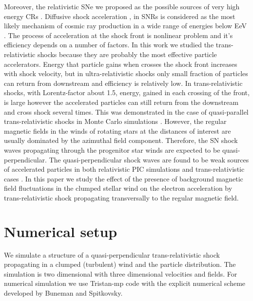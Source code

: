 \documentclass[a4paper]{jpconf}
\begin{document}
Moreover, the relativistic SNe we proposed as the possible sources of very high energy CRs \cite{2007PhRvD..76h3009W,2011NatCo...2E.175C,2008ApJ...673..928B,2013ApJ...776...46E,BEMO18}. Diffusive shock acceleration \cite{Bell78}, \cite{Blandford78} in SNRs is considered as the most likely mechanism of cosmic ray production in a wide range of energies below EeV \cite{BEMO18}. The process of acceleration at the shock front is nonlinear problem and it's efficiency depends on a number of factors. In this work we studied the trans-relativistic shocks because they are probably the most effective particle accelerators. Energy that particle gains when crosses the shock front increases with shock velocity, but in ultra-relativistic shocks only small fraction of particles can return from downstream and efficiency is relatively low. In trans-relativistic shocks, with Lorentz-factor about 1.5, energy, gained in each crossing of the front, is large however the accelerated particles  can still return from the downstream and cross shock several times. This was demonstrated in the case of quasi-parallel trans-relativistic shocks in Monte Carlo simulations \cite{2013ApJ...776...46E,BEMO18}. However, the regular magnetic fields in the winds of rotating stars at the distances of interest are usually dominated by the azimuthal field component. Therefore, the SN shock waves propagating through the progenitor star winds are expected to be quasi-perpendicular.  The quasi-perpendicular shock waves are found to be weak sources of accelerated particles in both  relativistic PIC simulations \cite{Sironi2011} and trans-relativistic cases \cite{Romansky18,Crumley2019}. In this paper we study the effect of the presence of  background magnetic field fluctuations in the clumped stellar wind on the electron acceleration by trans-relativistic shock propagating transversally to the regular magnetic field.   

\section{Numerical setup}
We simulate a structure of a quasi-perpendicular trans-relativistic shock propagating in a clumped (turbulent) wind and the particle distribution. The simulation is two dimensional with three dimensional velocities and fields. For numerical simulation we use Tristan-mp code with the explicit numerical scheme developed by Buneman \cite{Buneman93} and  Spitkovsky\cite{Spitkovsky2005}.
\end{document}
